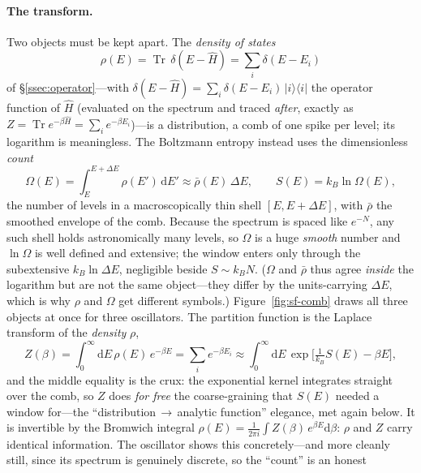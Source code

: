 \documentclass[11pt,a4paper]{article}
\theoremstyle{definition}
\newcommand{\dd}{\mathrm{d}}
\begin{document}
\paragraph{The transform.} Two objects must be kept apart. The \emph{density of
states}
\begin{equation}\label{eq:dos}
\rho(E)=\operatorname{Tr}\,\delta(E-\hat H)=\sum_i\delta(E-E_i)
\end{equation}
of \S\ref{ssec:operator}---with $\delta(E-\hat H)=\sum_i\delta(E-E_i)\,
|i\rangle\langle i|$ the operator function of $\hat H$ (evaluated on the spectrum
and traced \emph{after}, exactly as $Z=\operatorname{Tr}e^{-\beta\hat H}
=\sum_i e^{-\beta E_i}$)---is a distribution, a comb of one spike per level; its
logarithm is meaningless. The Boltzmann entropy instead uses the dimensionless
\emph{count}
\begin{equation}\label{eq:dos-count}
\Omega(E)=\int_E^{E+\Delta E}\!\rho(E')\,\dd E'\approx\bar\rho(E)\,\Delta E,
\qquad S(E)=k_B\ln\Omega(E),
\end{equation}
the number of levels in a macroscopically thin shell $[E,E+\Delta E]$, with
$\bar\rho$ the smoothed envelope of the comb. Because the spectrum is spaced like
$e^{-N}$, any such shell holds astronomically many levels, so $\Omega$ is a huge
\emph{smooth} number and $\ln\Omega$ is well defined and extensive; the window
enters only through the subextensive $k_B\ln\Delta E$, negligible beside
$S\sim k_BN$. ($\Omega$ and $\bar\rho$ thus agree \emph{inside} the logarithm but
are not the same object---they differ by the units-carrying $\Delta E$, which is
why $\rho$ and $\Omega$ get different symbols.) Figure~\ref{fig:sf-comb} draws
all three objects at once for three oscillators. The partition function is the
Laplace transform of the \emph{density} $\rho$,
\begin{equation}\label{eq:bridge-laplace}
Z(\beta)=\int_0^\infty\!\dd E\,\rho(E)\,e^{-\beta E}=\sum_i e^{-\beta E_i}
        \approx\int_0^\infty\!\dd E\,\exp\!\Big[\tfrac{1}{k_B}S(E)-\beta E\Big],
\end{equation}
and the middle equality is the crux: the exponential kernel integrates straight
over the comb, so $Z$ does \emph{for free} the coarse-graining that $S(E)$ needed
a window for---the ``distribution\,$\to$\,analytic function'' elegance, met again
below. It is invertible by the Bromwich integral
$\rho(E)=\frac{1}{2\pi i}\int Z(\beta)\,e^{\beta E}\dd\beta$: $\rho$ and $Z$ carry
identical information. The oscillator shows this concretely---and more cleanly
still, since its spectrum is genuinely discrete, so the ``count'' is an honest
\end{document}
